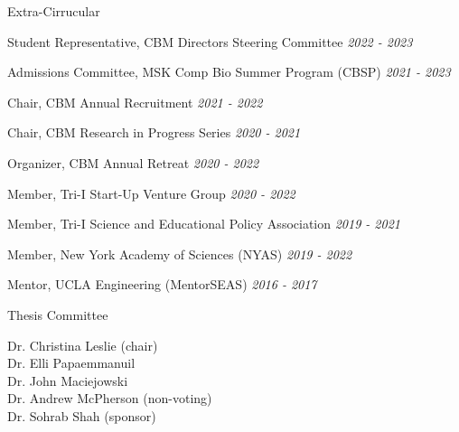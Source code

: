 \documentclass{resume} %
\begin{document}
\begin{rSection}{Extra-Cirrucular} \itemsep -3pt
\item Student Representative, CBM Directors Steering Committee \hfill {\em 2022 - 2023}
\item Admissions Committee, MSK Comp Bio Summer Program (CBSP) \hfill {\em 2021 - 2023}
\item Chair, CBM Annual Recruitment \hfill {\em 2021 - 2022}
\item Chair, CBM Research in Progress Series \hfill {\em 2020 - 2021}
\item Organizer, CBM Annual Retreat \hfill {\em 2020 - 2022}
\item Member, Tri-I Start-Up Venture Group \hfill {\em 2020 - 2022}
\item Member, Tri-I Science and Educational Policy Association \hfill {\em 2019 - 2021}
\item Member, New York Academy of Sciences (NYAS) \hfill {\em 2019 - 2022}
\item Mentor, UCLA Engineering (MentorSEAS) \hfill {\em 2016 - 2017}

\end{rSection}



\begin{rSection}{Thesis Committee}

Dr. Christina Leslie (chair) \\
Dr. Elli Papaemmanuil \\
Dr. John Maciejowski \\
Dr. Andrew McPherson (non-voting) \\
Dr. Sohrab Shah (sponsor)

\end{rSection}

\end{document}
